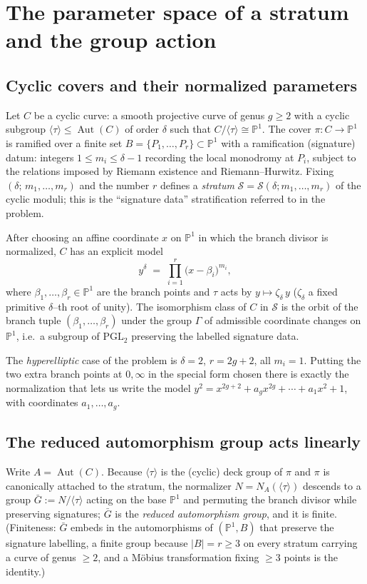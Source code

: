 \documentclass{amsart}
\theoremstyle{definition}
\DeclareMathOperator{\Aut}{Aut}
\begin{document}
\section{The parameter space of a stratum and the group action}\label{sec:setup}

\subsection{Cyclic covers and their normalized parameters}
Let $C$ be a cyclic curve: a smooth projective curve of genus $g\ge 2$ with a
cyclic subgroup $\langle\tau\rangle\le \Aut(C)$ of order $\delta$ such that
$C/\langle\tau\rangle\cong\mathbb{P}^1$. The cover $\pi:C\to\mathbb{P}^1$ is
ramified over a finite set $B=\{P_1,\dots,P_r\}\subset\mathbb{P}^1$ with a
ramification (signature) datum: integers
$1\le m_i\le \delta-1$ recording the local monodromy at $P_i$, subject to the
relations imposed by Riemann existence and Riemann--Hurwitz. Fixing
$(\delta;\,m_1,\dots,m_r)$ and the number $r$ defines a \emph{stratum}
$\mathcal{S}=\mathcal{S}(\delta;m_1,\dots,m_r)$ of the cyclic moduli; this is the
``signature data'' stratification referred to in the problem.

After choosing an affine coordinate $x$ on $\mathbb{P}^1$ in which the branch
divisor is normalized, $C$ has an explicit model
\begin{equation}\label{eq:model}
 y^{\delta} \;=\; \prod_{i=1}^{r}\bigl(x-\beta_i\bigr)^{m_i},
\end{equation}
where $\beta_1,\dots,\beta_r\in\mathbb{P}^1$ are the branch points and $\tau$ acts
by $y\mapsto\zeta_\delta\, y$ ($\zeta_\delta$ a fixed primitive $\delta$--th root
of unity). The isomorphism class of $C$ in $\mathcal S$ is the orbit of the branch
tuple $(\beta_1,\dots,\beta_r)$ under the group $\Gamma$ of admissible coordinate
changes on $\mathbb{P}^1$, i.e.\ a subgroup of $\mathrm{PGL}_2$ preserving the
labelled signature data.

The \emph{hyperelliptic} case of the problem is $\delta=2$, $r=2g+2$, all $m_i=1$.
Putting the two extra branch points at $0,\infty$ in the special form chosen there
is exactly the normalization that lets us write the model
$y^2=x^{2g+2}+a_g x^{2g}+\cdots+a_1 x^2+1$, with coordinates $a_1,\dots,a_g$.

\subsection{The reduced automorphism group acts linearly}
Write $A=\Aut(C)$. Because $\langle\tau\rangle$ is the (cyclic) deck group of
$\pi$ and $\pi$ is canonically attached to the stratum, the normalizer
$N=N_A(\langle\tau\rangle)$ descends to a group
$\bar G:=N/\langle\tau\rangle$
acting on the base $\mathbb{P}^1$ and permuting the branch divisor while
preserving signatures; $\bar G$ is the \emph{reduced automorphism group}, and it
is finite. (Finiteness: $\bar G$ embeds in the automorphisms of
$(\mathbb{P}^1,B)$ that preserve the signature labelling, a finite group because
$|B|=r\ge 3$ on every stratum carrying a curve of genus $\ge 2$, and a M\"obius
transformation fixing $\ge 3$ points is the identity.)
\end{document}
